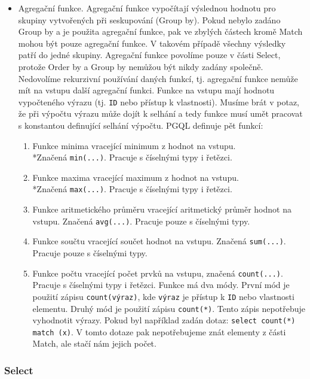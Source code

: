 \begin{itemize}
\item 
Agregační funkce.
Agregační funkce vypočítají výslednou hodnotu pro skupiny vytvořených při seskupování (Group by).
Pokud nebylo zadáno Group by a je použita agregační funkce, pak ve zbylých částech kromě Match mohou být pouze agregační funkce.
V takovém případě všechny výsledky patří do jedné skupiny.
Agregační funkce povolíme pouze v části Select, protože Order by a Group by nemůžou být nikdy zadány společně.
Nedovolíme rekurzivní používání daných funkcí, tj. agregační funkce nemůže mít na vstupu další agregační funkci.
Funkce na vstupu mají hodnotu vypočteného výrazu (tj. \texttt{ID} nebo přístup k vlastnosti).
Musíme brát v potaz, že při výpočtu výrazu může dojít k selhání a tedy funkce musí umět pracovat s konstantou definující selhání výpočtu.
PGQL definuje pět funkcí:
\begin{enumerate}
\item Funkce minima vracející minimum z hodnot na vstupu. 
\\*Značená \texttt{min(...)}.
Pracuje s číselnými typy i řetězci.
\item Funkce maxima vracející maximum z hodnot na vstupu. 
\\*Značená \texttt{max(...)}.
Pracuje s číselnými typy i řetězci.
\item Funkce aritmetického průměru vracející aritmetický průměr hodnot na vstupu.
Značená \texttt{avg(...)}.
Pracuje pouze s číselnými typy.
\item Funkce součtu vracející součet hodnot na vstupu. Značená \texttt{sum(...)}.
Pracuje pouze s číselnými typy.
\item Funkce počtu vracející počet prvků na vstupu, značená \texttt{count(...)}.
Pracuje s číselnými typy i řetězci.
Funkce má dva módy.
První mód je použití zápisu \texttt{count(výraz)}, kde \texttt{výraz} je přístup k \texttt{ID} nebo vlastnosti elementu.
Druhý mód je použití zápisu \texttt{count(*)}.
Tento zápis nepotřebuje vyhodnotit výrazy.
Pokud byl například zadán dotaz:
\texttt{select count(*) match (x)}.
V tomto dotaze pak nepotřebujeme znát elementy z části Match, ale stačí nám jejich počet.
\end{enumerate}
\end{itemize}

\subsubsection{Select}

